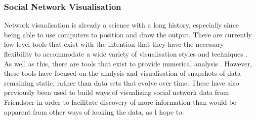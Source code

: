 \documentclass[12pt,a4paper]{article}
\begin{document}
\subsubsection{Social Network Visualisation}
Network visualisation is already a science with a long history, especially since being able to use computers to position and draw the output. There are currently low-level tools that exist with the intention that they have the necessary flexibility to accommodate a wide variety of visualisation styles and techniques \cite{heer2005prefuse}. As well as this, there are tools that exist to provide numerical analysis \cite{borgatti2002ucinet}. However, these tools have focused on the analysis and visualisation of snapshots of data remaining static, rather than data sets that evolve over time. These have also previously been used to build ways of visualising social network data from Friendster \cite{heer2005vizster} in order to facilitate discovery of more information than would be apparent from other ways of looking the data, as I hope to.
\end{document}
